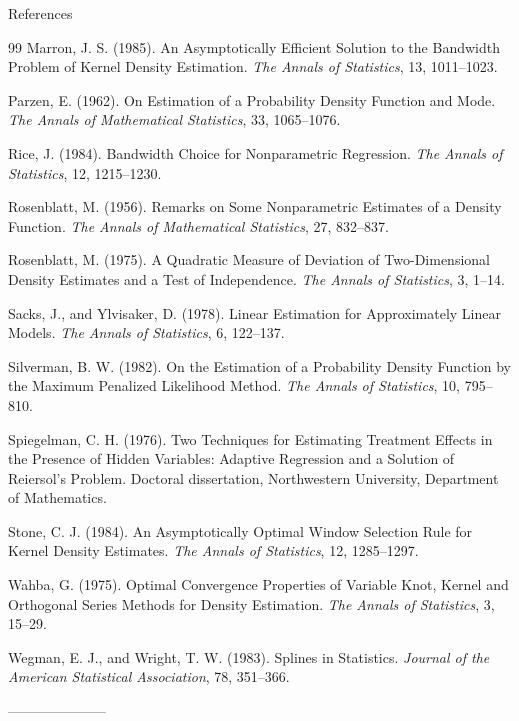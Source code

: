 \begin{frame}[allowframebreaks]{References}
\begin{thebibliography}{99}
Marron, J. S. (1985).
\newblock An Asymptotically Efficient Solution to the Bandwidth Problem of Kernel Density Estimation.
\newblock \emph{The Annals of Statistics}, 13, 1011--1023.

Parzen, E. (1962).
\newblock On Estimation of a Probability Density Function and Mode.
\newblock \emph{The Annals of Mathematical Statistics}, 33, 1065--1076.

Rice, J. (1984).
\newblock Bandwidth Choice for Nonparametric Regression.
\newblock \emph{The Annals of Statistics}, 12, 1215--1230.

Rosenblatt, M. (1956).
\newblock Remarks on Some Nonparametric Estimates of a Density Function.
\newblock \emph{The Annals of Mathematical Statistics}, 27, 832--837.

Rosenblatt, M. (1975).
\newblock A Quadratic Measure of Deviation of Two-Dimensional Density Estimates and a Test of Independence.
\newblock \emph{The Annals of Statistics}, 3, 1--14.

Sacks, J., and Ylvisaker, D. (1978).
\newblock Linear Estimation for Approximately Linear Models.
\newblock \emph{The Annals of Statistics}, 6, 122--137.

Silverman, B. W. (1982).
\newblock On the Estimation of a Probability Density Function by the Maximum Penalized Likelihood Method.
\newblock \emph{The Annals of Statistics}, 10, 795--810.

Spiegelman, C. H. (1976).
\newblock Two Techniques for Estimating Treatment Effects in the Presence of Hidden Variables: Adaptive Regression and a Solution of Reiersol's Problem.
\newblock Doctoral dissertation, Northwestern University, Department of Mathematics.

Stone, C. J. (1984).
\newblock An Asymptotically Optimal Window Selection Rule for Kernel Density Estimates.
\newblock \emph{The Annals of Statistics}, 12, 1285--1297.

Wahba, G. (1975).
\newblock Optimal Convergence Properties of Variable Knot, Kernel and Orthogonal Series Methods for Density Estimation.
\newblock \emph{The Annals of Statistics}, 3, 15--29.

Wegman, E. J., and Wright, T. W. (1983).
\newblock Splines in Statistics.
\newblock \emph{Journal of the American Statistical Association}, 78, 351--366.

\end{thebibliography}
\end{frame}

---------------------
